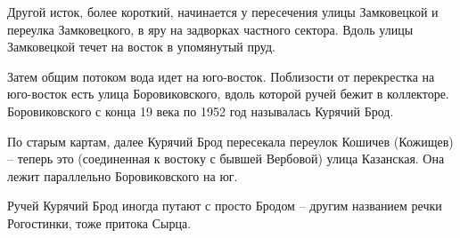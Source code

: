
Другой исток, более короткий, начинается у пересечения улицы Замковецкой и переулка Замковецкого, в яру на задворках частного сектора. Вдоль улицы Замковецкой течет на восток в упомянутый пруд. 

Затем общим потоком вода идет на юго-вос\-ток. Поблизости от перекрестка на юго-восток есть улица Боровиковского, вдоль которой ручей бежит в коллекторе. Боровиковского с конца 19 века по 1952 год называлась Курячий Брод.

По старым картам, далее Курячий Брод пересекала переулок Кошичев (Кожищев) – теперь это (соединенная к востоку с бывшей Вербовой) улица Казанская. Она лежит параллельно Боровиковского на юг.

Ручей Курячий Брод иногда путают с просто Бродом – другим названием речки Рогостинки, тоже притока Сырца. 
